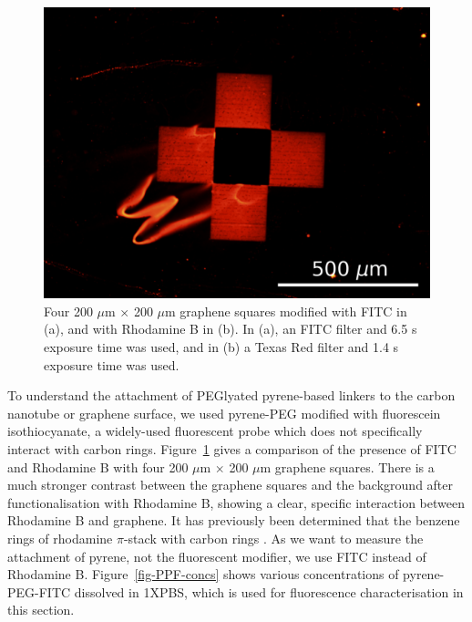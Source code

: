 \documentclass[
  a4paper,
]{scrbook}
\begin{document}
\begin{figure}
\begin{minipage}[t]{0.47\linewidth}
{{\includegraphics{figures/ch6/NGW8D4_rhodamineB_cornergraphene_221110.png}

}

}

\subcaption{\label{fig-rhodamine}}
\end{minipage}%

\caption{\label{fig-FITC-rhodamine-B}Four 200 \(\mu\)m \(\times\) 200
\(\mu\)m graphene squares modified with FITC in (a), and with Rhodamine
B in (b). In (a), an FITC filter and 6.5 s exposure time was used, and
in (b) a Texas Red filter and 1.4 s exposure time was used.}

\end{figure}

To understand the attachment of PEGlyated pyrene-based linkers to the
carbon nanotube or graphene surface, we used pyrene-PEG modified with
fluorescein isothiocyanate, a widely-used fluorescent probe which does
not specifically interact with carbon rings.
Figure~\ref{fig-FITC-rhodamine-B} gives a comparison of the presence of
FITC and Rhodamine B with four 200 \(\mu\)m \(\times\) 200 \(\mu\)m
graphene squares. There is a much stronger contrast between the graphene
squares and the background after functionalisation with Rhodamine B,
showing a clear, specific interaction between Rhodamine B and graphene.
It has previously been determined that the benzene rings of rhodamine
\(\pi\)-stack with carbon rings \autocite{Tang2012}. As we want to
measure the attachment of pyrene, not the fluorescent modifier, we use
FITC instead of Rhodamine B. Figure~\ref{fig-PPF-concs} shows various
concentrations of pyrene-PEG-FITC dissolved in 1XPBS, which is used for
fluorescence characterisation in this section.
\end{document}
